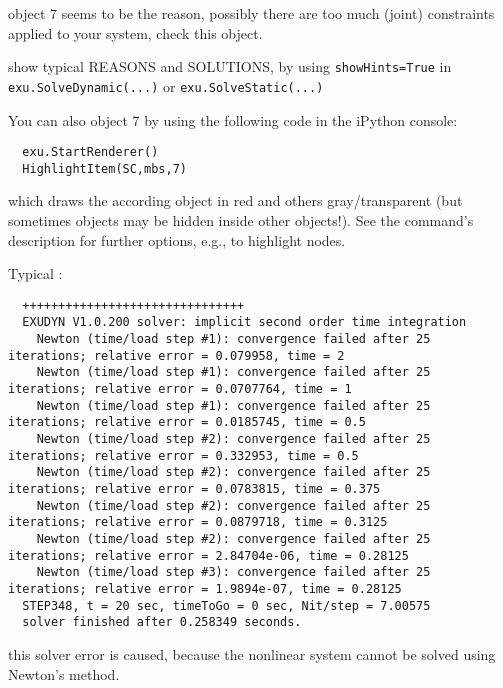 %
\bi
\item[$\ra$] object 7 seems to be the reason, possibly there are too much (joint) constraints applied to your system, check this object.
\item[$\ra$] show typical REASONS and SOLUTIONS, by using \texttt{showHints=True} in \texttt{exu.SolveDynamic(...)} or \texttt{exu.SolveStatic(...)}
\item[$\ra$] You can also  object 7 by using the following code in the iPython console:
\ei
\pythonstyle\begin{lstlisting}
  exu.StartRenderer()
  HighlightItem(SC,mbs,7)
\end{lstlisting}
%
which draws the according object in red and others gray/transparent (but sometimes objects may be hidden inside other objects!). See the command's description for further options, e.g., to highlight nodes.
\vspace{12pt}\\
\item Typical :
\plainlststyle
\begin{lstlisting}
  +++++++++++++++++++++++++++++++
  EXUDYN V1.0.200 solver: implicit second order time integration
    Newton (time/load step #1): convergence failed after 25 iterations; relative error = 0.079958, time = 2
    Newton (time/load step #1): convergence failed after 25 iterations; relative error = 0.0707764, time = 1
    Newton (time/load step #1): convergence failed after 25 iterations; relative error = 0.0185745, time = 0.5
    Newton (time/load step #2): convergence failed after 25 iterations; relative error = 0.332953, time = 0.5
    Newton (time/load step #2): convergence failed after 25 iterations; relative error = 0.0783815, time = 0.375
    Newton (time/load step #2): convergence failed after 25 iterations; relative error = 0.0879718, time = 0.3125
    Newton (time/load step #2): convergence failed after 25 iterations; relative error = 2.84704e-06, time = 0.28125
    Newton (time/load step #3): convergence failed after 25 iterations; relative error = 1.9894e-07, time = 0.28125
  STEP348, t = 20 sec, timeToGo = 0 sec, Nit/step = 7.00575
  solver finished after 0.258349 seconds.
\end{lstlisting}
\onlyRST{\rstStartNewLine}
%
\bi
\item[$\ra$] this solver error is caused, because the nonlinear system cannot be solved using Newton's method.
